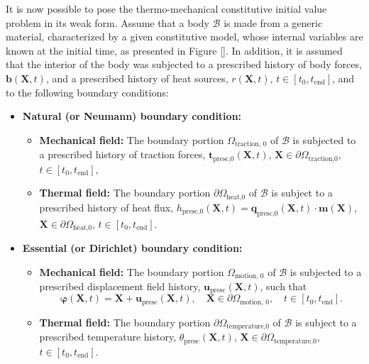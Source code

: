 It is now possible to pose the thermo-mechanical constitutive initial value problem in its weak form.
Assume that a body $\mathscr{B}$ is made from a generic material, characterized by a given constitutive model, whose internal variables are known at the initial time, as presented in Figure \ref{}.
In addition, it is assumed that the interior of the body was subjected to a prescribed history of body forces, $\bm b(\bm X, t)$, and a prescribed history of heat sources, $r(\bm X,t)$, $t\in[t_0, t_\text{end}]$, and to the following boundary conditions:
\begin{itemize}
    \item \textbf{Natural (or Neumann) boundary condition:}
    \begin{itemize}
      \item \textbf{Mechanical field:} The boundary portion $\Omega_\text{traction, 0}$ of $\mathscr{B}$ is subjected to a prescribed history of traction forces, $\bm t_\text{presc,0}(\bm X, t)$, $\bm X\in \partial \Omega_\text{traction,0}$, $t\in[t_0, t_\text{end}]$,\\
      \item \textbf{Thermal field:} The boundary portion \(\partial \Omega_\text{heat,0}\) of \(\mathcal B\) is subject to a prescribed history of heat flux, \(h_\text{presc,0}(\bm X, t) = \bm q_\text{presc,0}(\bm X, t)\cdot \bm m(\bm X)\), \(\bm X \in \partial \Omega_\text{heat,0}\), \(t\in [t_0,t_\text{end}]\).
    \end{itemize}
    \item \textbf{Essential (or Dirichlet) boundary condition:}
    \begin{itemize}
      \item \textbf{Mechanical field:} The boundary portion $\Omega_\text{motion, 0}$ of $\mathscr{B}$ is subjected to a prescribed displacement field history, $\bm u_\text{presc}(\bm X, t)$, such that $$\bm \varphi(\bm X, t) = \bm X + \bm u_\text{presc}(\bm X, t),\quad \bm X\in \partial\Omega_\text{motion, 0},\quad t\in[t_0, t_\text{end}].$$
      \item \textbf{Thermal field:} The boundary portion \(\partial \Omega_\text{temperature,0}\) of \(\mathcal B\) is subject to a prescribed temperature history, \(\theta_\text{presc}(\bm X, t)\), \(\bm X \in \partial \Omega_\text{temperature,0}\), \(t\in [t_0,t_\text{end}]\).
    \end{itemize}
\end{itemize}


